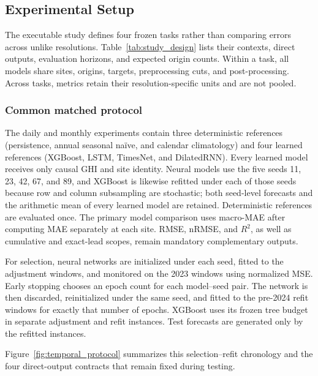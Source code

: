 \subsection{Experimental Setup}
\label{sec:experiments}

The executable study defines four frozen tasks rather than comparing errors
across unlike resolutions. Table~\ref{tab:study_design} lists their contexts,
direct outputs, evaluation horizons, and expected origin counts. Within a task,
all models share sites, origins, targets, preprocessing cuts, and
post-processing. Across tasks, metrics retain their resolution-specific units
and are not pooled.



\subsubsection{Common matched protocol}

The daily and monthly experiments contain three deterministic references
(persistence, annual seasonal na\"ive, and calendar climatology) and four
learned references (XGBoost, LSTM, TimesNet, and DilatedRNN). Every learned
model receives only causal GHI and site identity. Neural models use the five
seeds 11, 23, 42, 67, and 89, and XGBoost is likewise refitted under each of
those seeds because row and column subsampling are stochastic; both seed-level
forecasts and the arithmetic mean of every learned model are retained.
Deterministic references are evaluated once. The primary model comparison uses
macro-MAE after computing
MAE separately at each site. RMSE, nRMSE, and $R^2$, as well as cumulative and
exact-lead scopes, remain mandatory complementary outputs.

For selection, neural networks are initialized under each seed, fitted to the
adjustment windows, and monitored on the 2023 windows using normalized MSE.
Early stopping chooses an epoch count for each model--seed pair. The network is
then discarded, reinitialized under the same seed, and fitted to the pre-2024
refit windows for exactly that number of epochs. XGBoost uses its frozen tree
budget in separate adjustment and refit instances. Test forecasts are generated
only by the refitted instances.

Figure~\ref{fig:temporal_protocol} summarizes this selection--refit chronology
and the four direct-output contracts that remain fixed during testing.



